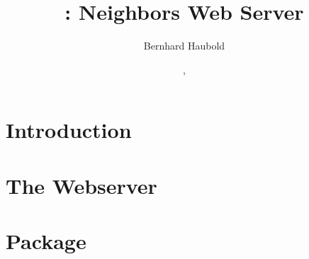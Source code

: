 \documentclass[a4paper]{report}
\begin{document}
\pagestyle{noweb}

\title{: Neighbors Web Server}
\author{Bernhard Haubold}
\date{\!\!, }
\maketitle
\tableofcontents
\chapter{Introduction}

\chapter{The Webserver}

\chapter{Package }



\end{document}

